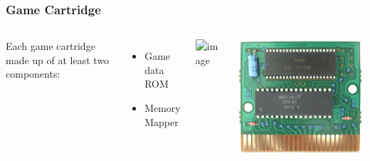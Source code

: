 \documentclass{beamer}
\begin{document}
\begin{frame}
    \frametitle{Game Cartridge}

    \begin{columns}[c]
            Each game cartridge made up of at least two components:
            \begin{itemize}
                \item<2->Game data ROM
                \item<3->Memory Mapper
            \end{itemize}
            \includegraphics<4->[width=\textwidth]{../design/mapper.png}

            \includegraphics[width=\textwidth]{../design/gg_cart_pcb.png}
    \end{columns}
\end{frame}
\end{document}
